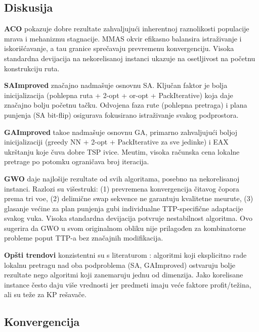 \documentclass[12pt,a4paper]{article}
\begin{document}
\subsection{Diskusija}

\textbf{ACO} pokazuje dobre rezultate zahvaljuju\'{c}i inherentnoj raznolikosti populacije mrava i mehanizmu stagnacije. MMAS okvir efikasno balansira istra\v{z}ivanje i iskori\v{s}\'{c}avanje, a tau granice spre\v{c}avaju prevremenu konvergenciju. Visoka standardna devijacija na nekorelisanoj instanci ukazuje na osetljivost na po\v{c}etnu konstrukciju ruta.

\textbf{SAImproved} zna\v{c}ajno nadma\v{s}uje osnovnu SA. Klju\v{c}an faktor je bolja inicijalizacija (pohlepna ruta + 2-opt + or-opt + PackIterative) koja daje zna\v{c}ajno bolju po\v{c}etnu ta\v{c}ku. Odvojena faza rute (pohlepna pretraga) i plana punjenja (SA bit-flip) osigurava fokusirano istra\v{z}ivanje svakog podprostora.

\textbf{GAImproved} tako\dj{}e nadma\v{s}uje osnovnu GA, primarno zahvaljuju\'{c}i boljoj inicijalizaciji (greedy NN + 2-opt + PackIterative za sve jedinke) i EAX ukrštanju koje \v{c}uva dobre TSP ivice. Me\dj{}utim, visoka ra\v{c}unska cena lokalne pretrage po potomku ograni\v{c}ava broj iteracija.

\textbf{GWO} daje najlo\v{s}ije rezultate od svih algoritama, posebno na nekorelisanoj instanci. Razlozi su vi\v{s}estruki: (1) prevremena konvergencija \v{c}itavog \v{c}opora prema tri vo\dj{}e, (2) delimi\v{c}ne swap sekvence ne garantuju kvalitetne me\dj{}urute, (3) glasanje ve\'{c}ine za plan punjenja gubi individualne TTP-specifi\v{c}ne adaptacije svakog vuka. Visoka standardna devijacija potvr\dj{}uje nestabilnost algoritma. Ovo sugerira da GWO u svom originalnom obliku nije prilagođen za kombinatorne probleme poput TTP-a bez zna\v{c}ajnih modifikacija.

\textbf{Opšti trendovi} konzistentni su s literaturom \cite{wagner_selection}: algoritmi koji eksplicitno rade lokalnu pretragu nad oba podproblema (SA, GAImproved) ostvaruju bolje rezultate nego algoritmi koji zanemaruju jednu od dimenzija. Jako korelisane instance \v{c}esto daju vi\v{s}e vrednosti jer predmeti imaju ve\'{c}e faktore profit/te\v{z}ina, ali su te\v{z}e za KP re\v{s}ava\v{c}e.

\subsection{Konvergencija}
\end{document}
